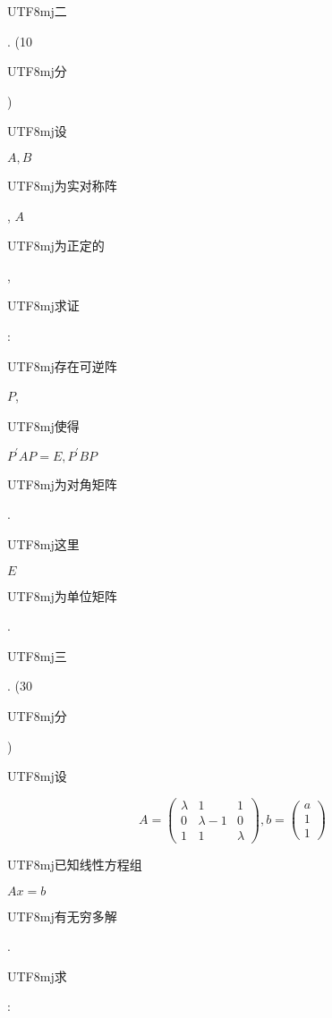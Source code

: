 \documentclass[10pt]{article}
\begin{document}
\begin{CJK}{UTF8}{mj}二\end{CJK}. (10 \begin{CJK}{UTF8}{mj}分\end{CJK}) \begin{CJK}{UTF8}{mj}设\end{CJK} $A, B$ \begin{CJK}{UTF8}{mj}为实对称阵\end{CJK}, $A$ \begin{CJK}{UTF8}{mj}为正定的\end{CJK}, \begin{CJK}{UTF8}{mj}求证\end{CJK}: \begin{CJK}{UTF8}{mj}存在可逆阵\end{CJK} $P$, \begin{CJK}{UTF8}{mj}使得\end{CJK} $P^{\prime} A P=E, P^{\prime} B P$ \begin{CJK}{UTF8}{mj}为对角矩阵\end{CJK}. \begin{CJK}{UTF8}{mj}这里\end{CJK} $E$ \begin{CJK}{UTF8}{mj}为单位矩阵\end{CJK}.

\begin{CJK}{UTF8}{mj}三\end{CJK}. (30 \begin{CJK}{UTF8}{mj}分\end{CJK}) \begin{CJK}{UTF8}{mj}设\end{CJK}
$$
A=\left(\begin{array}{ccc}
\lambda & 1 & 1 \\
0 & \lambda-1 & 0 \\
1 & 1 & \lambda
\end{array}\right), b=\left(\begin{array}{l}
a \\
1 \\
1
\end{array}\right)
$$
\begin{CJK}{UTF8}{mj}已知线性方程组\end{CJK} $A x=b$ \begin{CJK}{UTF8}{mj}有无穷多解\end{CJK}. \begin{CJK}{UTF8}{mj}求\end{CJK}:
\end{document}
